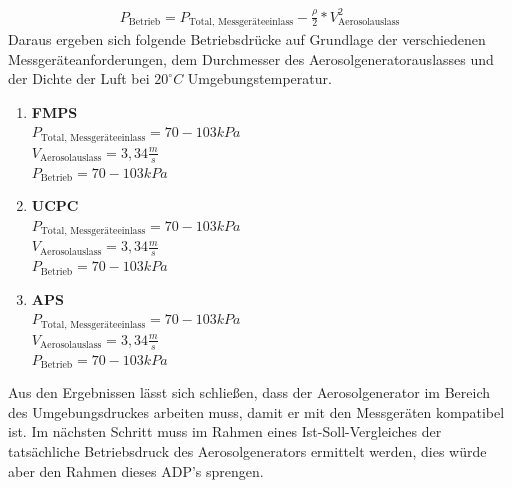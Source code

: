 \begin{align*}
	P_\text{Betrieb} = P_\text{Total, Messger\"{a}teeinlass} - \frac{\rho}{2} * V_			\text{Aerosolauslass}^2
\end{align*}
Daraus ergeben sich folgende Betriebsdr\"{u}cke auf Grundlage der verschiedenen Messger\"{a}teanforderungen, dem Durchmesser des Aerosolgeneratorauslasses und der Dichte der Luft bei \(20^\circ C\) Umgebungstemperatur\cite{fmps_3091}\cite{ops_3330}\cite{ucpc_3776}\cite{aps_3321}\cite{topas}.
\begin{enumerate}
	\item \textbf{FMPS}\\
	\(P_\text{Total, Messger\"{a}teeinlass} = 70 - 103 kPa\)\\
	\(V_\text{Aerosolauslass} = 3,34 \frac{m}{s}\)\\
	\(P_\text{Betrieb} = 70 - 103 kPa\)\\
	\item \textbf{UCPC}\\
	\(P_\text{Total, Messger\"{a}teeinlass} = 70 - 103 kPa\)\\
	\(V_\text{Aerosolauslass} = 3,34 \frac{m}{s}\)\\
	\(P_\text{Betrieb} = 70 - 103 kPa\)\\
	\item \textbf{APS}\\
	\(P_\text{Total, Messger\"{a}teeinlass} = 70 - 103 kPa\)\\
	\(V_\text{Aerosolauslass} = 3,34 \frac{m}{s}\)\\
	\(P_\text{Betrieb} = 70 - 103 kPa\)
\end{enumerate} 
Aus den Ergebnissen l\"{a}sst sich schlie{\ss}en, dass der Aerosolgenerator im Bereich des Umgebungsdruckes arbeiten muss, damit er mit den Messger\"{a}ten kompatibel ist. Im n\"{a}chsten Schritt muss im Rahmen eines Ist-Soll-Vergleiches der tats\"{a}chliche Betriebsdruck des Aerosolgenerators ermittelt werden, dies w\"{u}rde aber den Rahmen dieses ADP's sprengen.
